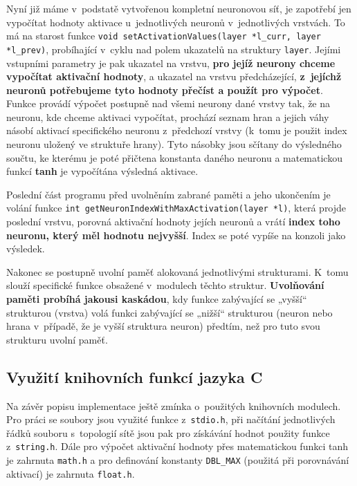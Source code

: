 \documentclass[11pt]{article}
\begin{document}
Nyní již máme v~podstatě vytvořenou kompletní neuronovou síť, je zapotřebí jen vypočítat hodnoty aktivace u~jednotlivých neuronů v~jednotlivých vrstvách. To má na starost funkce \texttt{void setActivationValues(layer *l\_curr, layer *l\_prev)}, probíhající v~cyklu nad polem ukazatelů na struktury \texttt{layer}. Jejími vstupními parametry je pak ukazatel na vrstvu, \textbf{pro jejíž neurony chceme vypočítat aktivační hodnoty}, a ukazatel na vrstvu předcházející, \textbf{z~jejíchž neuronů potřebujeme tyto hodnoty přečíst a použít pro výpočet}. Funkce provádí výpočet postupně nad všemi neurony dané vrstvy tak, že na neuronu, kde chceme aktivaci vypočítat, prochází seznam hran a jejich váhy násobí aktivací specifického neuronu z~předchozí vrstvy (k~tomu je použit index neuronu uložený ve struktuře hrany). Tyto násobky jsou sčítany do výsledného součtu, ke kterému je poté přičtena konstanta daného neuronu a matematickou funkcí \textbf{tanh} je vypočítána výsledná aktivace.

Poslední část programu před uvolněním zabrané paměti a jeho ukončením je volání funkce \texttt{int getNeuronIndexWithMaxActivation(layer *l)}, která projde poslední vrstvu, porovná aktivační hodnoty jejích neuronů a vrátí \textbf{index toho neuronu, který měl hodnotu nejvyšší}. Index se poté vypíše na konzoli jako výsledek.

Nakonec se postupně uvolní paměť alokovaná jednotlivými strukturami. K~tomu slouží specifické funkce obsažené v~modulech těchto struktur. \textbf{Uvolňování paměti probíhá jakousi kaskádou}, kdy funkce zabývající se „vyšší“ strukturou (vrstva) volá funkci zabývající se „nižší“ strukturou (neuron nebo hrana v~případě, že je vyšší struktura neuron) předtím, než pro tuto svou strukturu uvolní paměť.

\subsection{Využití knihovních funkcí jazyka C}
Na závěr popisu implementace ještě zmínka o~použitých knihovních modulech. Pro práci se soubory jsou využité funkce z~\texttt{stdio.h}, při načítání jednotlivých řádků souboru s~topologií sítě jsou pak pro získávání hodnot použity funkce z~\texttt{string.h}. Dále pro výpočet aktivační hodnoty přes matematickou funkci tanh je zahrnuta \texttt{math.h} a pro definování konstanty \texttt{DBL\_MAX} (použitá při porovnávání aktivací) je zahrnuta \texttt{float.h}.

\newpage
\end{document}
